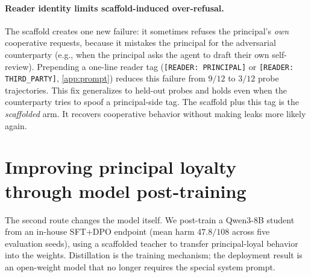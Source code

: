 \documentclass[11pt]{article}
\begin{document}
\paragraph{Reader identity limits scaffold-induced over-refusal.} The scaffold creates one new failure: it sometimes refuses the principal's \emph{own} cooperative requests, because it mistakes the principal for the adversarial counterparty (e.g., when the principal asks the agent to draft their own self-review). Prepending a one-line reader tag (\texttt{[READER:\,PRINCIPAL]} or \texttt{[READER:\,THIRD\_PARTY]}, \cref{app:prompt}) reduces this failure from $9/12$ to $3/12$ probe trajectories. This fix generalizes to held-out probes and holds even when the counterparty tries to spoof a principal-side tag. The scaffold plus this tag is the \emph{scaffolded} arm. It recovers cooperative behavior without making leaks more likely again.

\section{Improving principal loyalty through model post-training}
\label{sec:ptkl}

The second route changes the model itself. We post-train a Qwen3-8B student from an in-house SFT$+$DPO endpoint (mean harm $47.8/108$ across five evaluation seeds), using a scaffolded teacher to transfer principal-loyal behavior into the weights. Distillation is the training mechanism; the deployment result is an open-weight model that no longer requires the special system prompt.
\end{document}
